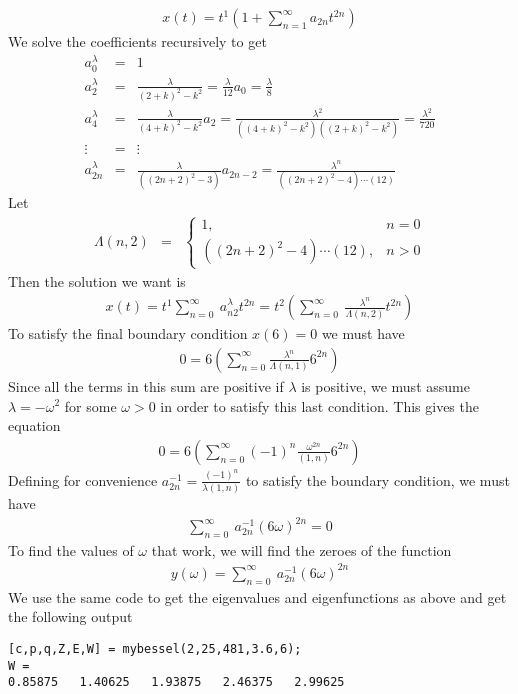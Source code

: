 \documentclass[11pt]{SelfArxOneColBMN}
\begin{document}
\begin{exercise}
\begin{solution}
    \begin{eqnarray*}
      x(t) = t^1(1 + \sum_{n=1}^\infty a_{2n}t^{2n})
    \end{eqnarray*}
    We solve the coefficients recursively to get
    \begin{eqnarray*}
      a_0^\lambda &=& 1\\
      a_2^\lambda &=& \frac{\lambda}{(2 + k)^2 - k^2} = \frac{\lambda}{12}a_0 = \frac{\lambda}{8}\\
      a_4^\lambda &=& \frac{\lambda}{(4 + k)^2 - k^2}a_2 = \frac{\lambda^2}{((4 + k)^2 - k^2)((2 + k)^2 - k^2)} = \frac{\lambda^2}{720}\\
      \vdots &=& \vdots\\
      a_{2n}^\lambda &=& \frac{\lambda}{((2n + 2)^2 - 3)}a_{2n - 2} = \frac{\lambda^n}{((2n + 2)^2 - 4)\cdots(12)}
    \end{eqnarray*}
    Let
    \begin{eqnarray*}
      \Lambda(n,2) &=&
      \left \{
      \begin{array}{ll}
        1, & n = 0\\
        ((2n + 2)^2 - 4)\cdots(12), & n > 0 
      \end{array}
      \right .
    \end{eqnarray*}
    Then the solution we want is
    \begin{eqnarray*}
      x(t) = t^1\sum_{n = 0}^\infty\:a_{n2}^\lambda t^{2n} = t^2(\sum_{n=0}^\infty\:\frac{\lambda^n}{\Lambda(n,2)}t^{2n})
    \end{eqnarray*}
    To satisfy the final boundary condition $x(6) = 0$ we must have
    \begin{eqnarray*}
      0 = 6(\sum_{n = 0}^\infty\frac{\lambda^n}{\Lambda(n,1)}6^{2n})
    \end{eqnarray*}
    Since all the terms in this sum are positive if $\lambda$ is positive, we must assume $\lambda = -\omega^2$ for some $\omega > 0$ in order to satisfy this last condition. This gives the equation
    \begin{eqnarray*}
      0 = 6(\sum_{n = 0}^\infty(-1)^n\frac{\omega^{2n}}{(1,n)}6^{2n})
    \end{eqnarray*}
    Defining for convenience $a_{2n}^{-1} = \frac{(-1)^n}{\lambda(1,n)}$ to satisfy the boundary condition, we must have
    \begin{eqnarray*}
      \sum_{n=0}^\infty\:a_{2n}^{-1}(6\omega)^{2n} = 0
    \end{eqnarray*}
    To find the values of $\omega$ that work, we will find the zeroes of the function
    \begin{eqnarray*}
      y(\omega) = \sum_{n=0}^\infty\:a_{2n}^{-1}(6\omega)^{2n}
    \end{eqnarray*}
    We use the same code to get the eigenvalues and eigenfunctions as above and get the following output
  \end{solution}
    \begin{lstlisting}
[c,p,q,Z,E,W] = mybessel(2,25,481,3.6,6);
W = 
0.85875   1.40625   1.93875   2.46375   2.99625


\end{lstlisting}
\end{exercise}
\end{document}
